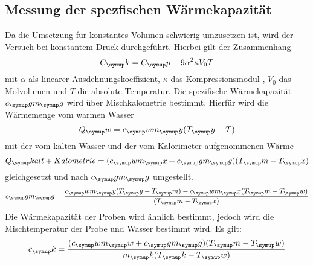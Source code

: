 \subsection{Messung der spezfischen Wärmekapazität}
Da die Umsetzung für konstantes Volumen schwierig umzusetzen ist, wird der
Versuch bei konstantem Druck durchgeführt. Hierbei gilt der Zusammenhang
\begin{equation}
  C_\su{k} = C_\su{p}-9\alpha^2\kappa V_0T
  \label{eq:mol}
\end{equation}
mit $\alpha$ als linearer Ausdehnungskoeffizient, $\kappa$ das Kompressionsmodul
, $V_0$ das Molvolumen und $T$ die absolute Temperatur. Die spezifische
Wärmekapazität $c_\su{g}m_\su{g}$ wird über Mischkalometrie bestimmt.
Hierfür wird die Wärmemenge vom warmen Wasser
\begin{equation}
  Q_\su{w}=c_\su{w}m_\su{y}(T_\su{y}-T)
\end{equation}
mit der vom kalten Wasser und der vom Kalorimeter aufgenommenen Wärme
\begin{equation}
  Q_\su{kalt+Kalometrie}=(c_\su{w}m_\su{x}+c_\su{g}m_\su{g})(T_\su{m}-T_\su{x})
\end{equation}
gleichgesetzt und nach $c_\su{g}m_\su{g}$ umgestellt.
\begin{equation}
  c_\su{g}m_\su{g}=\frac{c_\su{w}m_\su{y}(T_\su{y}-T_\su{m})-c_\su{w}m_\su{x}
  (T_\su{m}-T_\su{w})}{(T_\su{m}-T_\su{x})}
  \label{eq:kalo}
\end{equation}
Die Wärmekapazität der Proben wird ähnlich bestimmt, jedoch wird die
Mischtemperatur der Probe und Wasser bestimmt wird. Es gilt:
\begin{equation}
  c_\su{k}=\frac{(c_\su{w}m_\su{w}+c_\su{g}m_\su{g})(T_\su{m}-T_\su{w})}
  {m_\su{k}(T_\su{k}-T_\su{w})}
  \label{eq:probe}
\end{equation}
